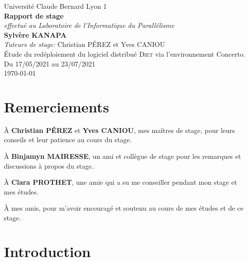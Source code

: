 \documentclass{article}
\newcommand{\UCBL}{Université Claude Bernard Lyon 1\xspace}
\newcommand{\LIP}{Laboratoire de l'Informatique du Parallélisme\xspace}
\newcommand{\diet}{\textsc{Diet}\xspace} %
\newcommand{\concerto}{Concerto\xspace}
\begin{document}
\begin{titlepage}
	\begin{center}
		{\LARGE Université Claude Bernard Lyon 1}\\[2.5cm]
		\linespread{1.2}
		\huge {\bfseries Rapport de stage}\\
		{\large \emph{effectué au \LIP}}\\[1.5cm]
		\linespread{1}
		{\Large\bf Sylvère KANAPA}\\[1cm]
		{\large \emph{Tuteurs de stage:} Christian PÉREZ et Yves CANIOU}\\
		{\Large Étude du redéploiement du logiciel distribué \diet via
		l’environnement \concerto.}\\[0.5cm]
		{\Large Du 17/05/2021 au 23/07/2021}\\[1cm]
		\vspace{\fill}
		\today
	\end{center}

\end{titlepage}


\newpage
\section*{Remerciements}
À \textbf{Christian PÉREZ} et \textbf{Yves CANIOU}, mes maîtres de stage, pour
leurs conseils et leur patience au cours du stage.


À \textbf{Binjamyn MAIRESSE}, un ami et collègue de stage pour les remarques et
discussions à propos du stage.

À \textbf{Clara PROTHET}, une amie qui a su me conseiller pendant mon stage et
mes études.

À mes amis, pour m'avoir encouragé et soutenu au cours de mes études et de ce
stage.


\newpage

\doublespacing
\tableofcontents

\newpage
\singlespacing
\section{Introduction}
\end{document}
